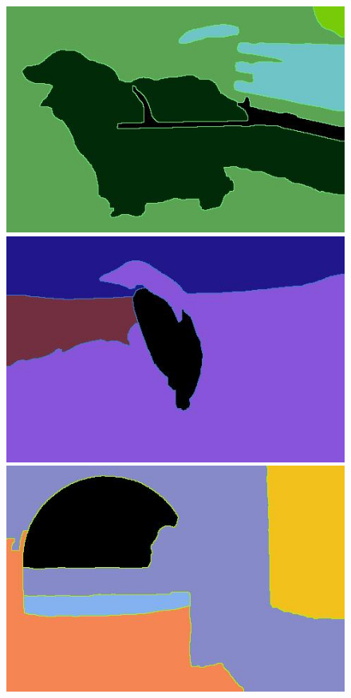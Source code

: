 \begin{figure}[h]
{\begin{minipage}[b]{0.13\linewidth}
\includegraphics[width=1\linewidth]{figures/img/align/align_247012.jpg}
\includegraphics[width=1\linewidth]{figures/img/align/align_106005.jpg}
\includegraphics[width=1\linewidth]{figures/img/align/align_5096.jpg}

\end{minipage}}
\end{figure}
